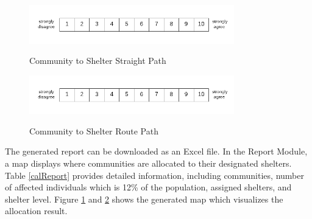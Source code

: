 	\begin{figure}[h!]
		\caption{Community to Shelter Straight Path}
		\centering
		\includegraphics[width=3.5in]{Nrs-10}
		\label{straightpath}
	\end{figure}
	
	\begin{figure}[h!]
		\caption{Community to Shelter Route Path}
		\centering
		\includegraphics[width=3.5in]{Nrs-10}
		\label{routepath}
	\end{figure}
	
	The generated report can be downloaded as an Excel file. In the Report Module, a map displays where communities are allocated to their designated shelters. Table \ref{calReport} provides detailed information, including communities, number of affected individuals which is 12\% of the population, assigned shelters, and shelter level. Figure \ref{straightpath} and \ref{routepath} shows the generated map which visualizes the allocation result.
	
	

%
%
